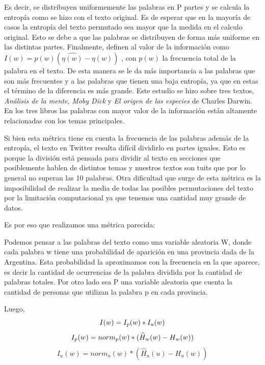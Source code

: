 Es decir, se distribuyen uniformemente las palabras en P partes y se calcula la
entropía como se hizo con el texto original. Es de esperar que en la mayoría de casos 
la entropía del texto permutado sea mayor que la medida en el calculo original. Esto 
se debe a que las palabras se distribuyen de forma más uniforme 
en las distintas partes.
Finalmente, definen al valor de la información como $I(w) = p(w) (\widehat{\eta(w)} - \eta(w))$ , con $p(w)$ la frecuencia total de la palabra en el texto. 
De esta manera se le da más importancia a las palabras que son más frecuentes y a las palabras que tienen una baja entropía, ya que en estas el término de la diferencia es más grande.
Este estudio se hizo sobre tres textos, \textit{Análisis de la mente}, 
\textit{Moby Dick} y \textit{El origen de las especies} de Charles Darwin. 
En los tres libros las palabras con mayor valor de la información están 
altamente relacionadas con los temas principales.

Si bien esta métrica tiene en cuenta la frecuencia de las palabras además de la 
entropía, el texto en Twitter resulta difícil dividirlo en partes iguales. 
Esto es porque la división está pensada para dividir al texto en secciones que 
posiblemente hablen de distintos temas y nuestros textos son tuits que por lo general no superan las 10 palabras.
Otra dificultad que surge de esta métrica es la imposibilidad de realizar la media 
de todas las posibles permutaciones del texto por la limitación computacional ya que 
tenemos una cantidad muy grande de datos.

Es por eso que realizamos una métrica parecida:

Podemos pensar a las palabras del texto como una variable aleatoria W, donde cada palabra w tiene una probabilidad de aparición en una provincia dada de la Argentina. Esta probabilidad la aproximamos con la frecuencia en la que aparece, es decir la cantidad de ocurrencias de la palabra dividida por la cantidad de palabras totales.
Por otro lado sea P una variable aleatoria que cuenta la cantidad de personas que 
utilizan la palabra p en cada provincia.

Luego,
\begin{equation}
I(w) =  I_p(w) * I_u(w)\\
\end{equation}
\begin{equation}
I_p(w) = norm_{p}(w) * (\widehat{H}_{w}(w) - H_{w}(w)) \\
\end{equation}
\begin{equation}
I_u(w) = norm_{u}(w) * (\widehat{H}_{u}(u) - H_{u}(w))
\end{equation}

